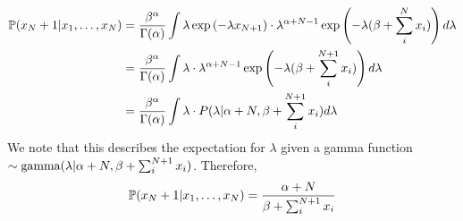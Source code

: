 \documentclass{article}
\begin{document}
\begin{enumerate}
\begin{enumerate}
\begin{align*}
                    \mathbb{P}(x_N+1|x_1,\hdots,x_N) &= \frac{\beta^\alpha}{\Gamma(\alpha)}
                        \int\lambda \exp\left(-\lambda x_{N+1}\right)
                        \cdot\lambda^{\alpha+N-1}\exp\left(-\lambda(\beta+\sum_i^{N}x_i)\right) d\lambda\\
                    &=  \frac{\beta^\alpha}{\Gamma(\alpha)} \int\lambda 
                        \cdot\lambda^{\alpha+N-1}\exp\left(-\lambda(\beta+\sum_i^{N+1}x_i)\right) d\lambda\\
                    &=  \frac{\beta^\alpha}{\Gamma(\alpha)} \int\lambda 
                        \cdot P(\lambda|\alpha+N,\beta+\sum_i^{N+1}x_i) d\lambda
               \end{align*}                        
                    We note that this describes the expectation for \(\lambda\) given a
                    gamma function \(\sim \textnormal{gamma}(\lambda|\alpha+N, \beta+\sum_i^{N+1}x_i)\).
                    Therefore,
               \begin{equation*}
                   \mathbb{P}(x_N+1|x_1,\hdots,x_N) = \frac{\alpha+N}{\beta+\sum_i^{N+1}x_i}
               \end{equation*}                   
                    

\end{enumerate}
\end{enumerate}
\end{document}
